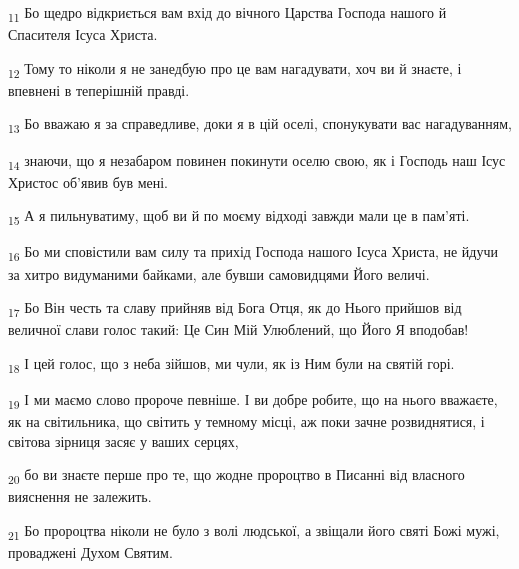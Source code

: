 \begin{tcolorbox}
\textsubscript{11} Бо щедро відкриється вам вхід до вічного Царства Господа нашого й Спасителя Ісуса Христа.
\end{tcolorbox}
\begin{tcolorbox}
\textsubscript{12} Тому то ніколи я не занедбую про це вам нагадувати, хоч ви й знаєте, і впевнені в теперішній правді.
\end{tcolorbox}
\begin{tcolorbox}
\textsubscript{13} Бо вважаю я за справедливе, доки я в цій оселі, спонукувати вас нагадуванням,
\end{tcolorbox}
\begin{tcolorbox}
\textsubscript{14} знаючи, що я незабаром повинен покинути оселю свою, як і Господь наш Ісус Христос об'явив був мені.
\end{tcolorbox}
\begin{tcolorbox}
\textsubscript{15} А я пильнуватиму, щоб ви й по моєму відході завжди мали це в пам'яті.
\end{tcolorbox}
\begin{tcolorbox}
\textsubscript{16} Бо ми сповістили вам силу та прихід Господа нашого Ісуса Христа, не йдучи за хитро видуманими байками, але бувши самовидцями Його величі.
\end{tcolorbox}
\begin{tcolorbox}
\textsubscript{17} Бо Він честь та славу прийняв від Бога Отця, як до Нього прийшов від величної слави голос такий: Це Син Мій Улюблений, що Його Я вподобав!
\end{tcolorbox}
\begin{tcolorbox}
\textsubscript{18} І цей голос, що з неба зійшов, ми чули, як із Ним були на святій горі.
\end{tcolorbox}
\begin{tcolorbox}
\textsubscript{19} І ми маємо слово пророче певніше. І ви добре робите, що на нього вважаєте, як на світильника, що світить у темному місці, аж поки зачне розвиднятися, і світова зірниця засяє у ваших серцях,
\end{tcolorbox}
\begin{tcolorbox}
\textsubscript{20} бо ви знаєте перше про те, що жодне пророцтво в Писанні від власного вияснення не залежить.
\end{tcolorbox}
\begin{tcolorbox}
\textsubscript{21} Бо пророцтва ніколи не було з волі людської, а звіщали його святі Божі мужі, проваджені Духом Святим.
\end{tcolorbox}
